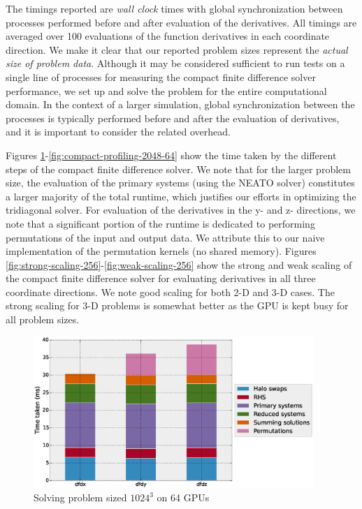 \documentclass{elsarticle}
\begin{document}
The timings reported are \emph{wall clock} times
with global synchronization between processes performed 
before and after evaluation of the derivatives.
All timings are averaged over 100 evaluations of the function derivatives
in each coordinate direction.
We make it clear that our reported
problem sizes represent the \emph{actual size of problem data}.
Although it may be considered sufficient to
run tests on a single line of processes
for measuring the compact finite difference solver performance,
we set up and solve the problem for the entire computational domain.
In the context of a larger simulation,
global synchronization between the processes
is typically performed before and after the evaluation of derivatives,
and it is important to consider the related overhead.

Figures \ref{fig:compact-profiling-1024-64}-\ref{fig:compact-profiling-2048-64}
show the time taken by the different steps of
the compact finite difference solver.
We note that for the larger problem size,
the evaluation of the primary systems (using the NEATO solver)
constitutes a larger majority of the total runtime,
which justifies our efforts in optimizing the tridiagonal solver.
For evaluation of the derivatives in the y- and z- directions,
we note that a significant portion of the runtime is dedicated
to performing permutations of the input and output data.
We attribute this to our naive implementation of the
permutation kernels (no shared memory).
Figures \ref{fig:strong-scaling-256}-\ref{fig:weak-scaling-256}
show the strong and weak scaling of the compact finite difference solver
for evaluating derivatives in all three coordinate directions.
We note good scaling for both 2-D and 3-D cases.
The strong scaling for 3-D problems is somewhat better
as the GPU is kept busy for all problem sizes.

\begin{figure}
\begin{center}
\includegraphics[width=300pt]{fig/profiling-1024-64.eps}
\caption{Solving problem sized $1024^3$ on 64 GPUs}
\label{fig:compact-profiling-1024-64}
\end{center}
\end{figure}
\end{document}
